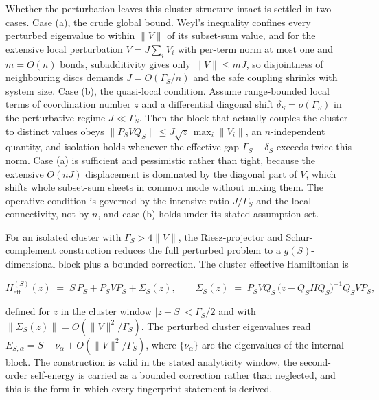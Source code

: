 Whether the perturbation leaves this cluster structure intact is settled in two cases. Case (a), the crude global bound. Weyl's inequality \cite{bhatia1997matrix} confines every perturbed eigenvalue to within $\|V\|$ of its subset-sum value, and for the extensive local perturbation $V = J \sum_i V_i$ with per-term norm at most one and $m = O(n)$ bonds, subadditivity gives only $\|V\| \le mJ$, so disjointness of neighbouring discs demands $J = O(\Gamma_S/n)$ and the safe coupling shrinks with system size. Case (b), the quasi-local condition. Assume range-bounded local terms of coordination number $z$ and a differential diagonal shift $\delta_S = o(\Gamma_S)$ in the perturbative regime $J \ll \Gamma_S$. Then the block that actually couples the cluster to distinct values obeys $\|P_S V Q_S\| \le J \sqrt{z}\, \max_i \|V_i\|$, an $n$-independent quantity, and isolation holds whenever the effective gap $\Gamma_S - \delta_S$ exceeds twice this norm. Case (a) is sufficient and pessimistic rather than tight, because the extensive $O(nJ)$ displacement is dominated by the diagonal part of $V$, which shifts whole subset-sum sheets in common mode without mixing them. The operative condition is governed by the intensive ratio $J/\Gamma_S$ and the local connectivity, not by $n$, and case (b) holds under its stated assumption set.

For an isolated cluster with $\Gamma_S > 4\|V\|$, the Riesz-projector and Schur-complement construction \cite{kato1995perturbation} reduces the full perturbed problem to a $g(S)$-dimensional block plus a bounded correction. The cluster effective Hamiltonian is
\begin{widetext}
\[
H_{\mathrm{eff}}^{(S)}(z) \;=\; S\, P_S + P_S V P_S + \Sigma_S(z), \qquad \Sigma_S(z) \;=\; P_S V Q_S\, \bigl(z - Q_S H Q_S\bigr)^{-1} Q_S V P_S,
\]
\end{widetext}
defined for $z$ in the cluster window $|z - S| < \Gamma_S/2$ and with $\|\Sigma_S(z)\| = O(\|V\|^2/\Gamma_S)$. The perturbed cluster eigenvalues read $E_{S,\alpha} = S + \nu_\alpha + O(\|V\|^2/\Gamma_S)$, where $\{\nu_\alpha\}$ are the eigenvalues of the internal block. The construction is valid in the stated analyticity window, the second-order self-energy is carried as a bounded correction rather than neglected, and this is the form in which every fingerprint statement is derived.

